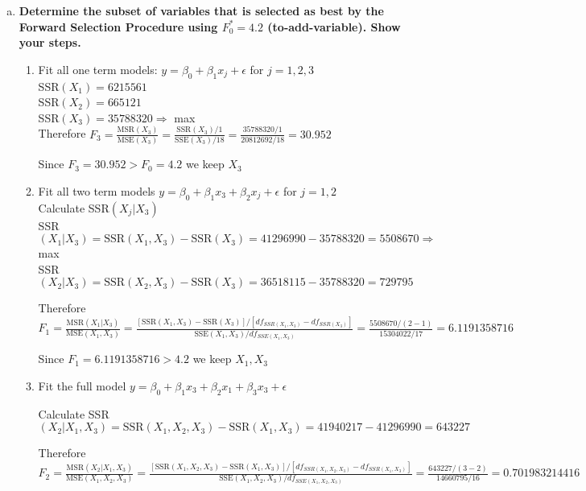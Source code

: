 \documentclass{article}
\begin{document}
\begin{enumerate}[(a)]
\item \textbf{Determine the subset of variables that is selected as best by the Forward Selection Procedure using $F_0^* = 4.2$ (to-add-variable). Show your steps. }

\begin{enumerate}[(1)]
\item Fit all one term models: $y = \beta_0 + \beta_1x_j + \epsilon$ for $j = 1,2,3$ \\
SSR$(X_1) = 6 215 561$ \\
SSR$(X_2) = 665 121$ \\
SSR$(X_3) = 35 788 320 \Rightarrow $ max \\

Therefore $F_3 = \frac{\text{MSR}(X_3)}{\text{MSE}(X_3)} = \frac{\text{SSR}(X_3)/1}{\text{SSE}(X_3)/18} = \frac{35 788 320/1}{20 812 692/18} = 30.952$

Since $F_3 = 30.952 > F_0 = 4.2$ we keep $X_3$

\item Fit all two term models $y = \beta_0 + \beta_1x_3 + \beta_2x_j + \epsilon$ for $j = 1,2$ \\

Calculate SSR$(X_j | X_3)$ \\

SSR$(X_1 | X_3) = \text{SSR}(X_1, X_3) - \text{SSR}(X_3) = 41 296 990 - 35 788 320 = 5 508 670 \Rightarrow$ max\\ 
SSR$(X_2 | X_3) = \text{SSR}(X_2, X_3) - \text{SSR}(X_3) = 36 518 115 - 35 788 320 = 729 795$

Therefore $F_1 = \frac{  \text{MSR}(X_1 | X_3) }{  \text{MSE}(X_1, X_3) } = 
\frac{ [ \text{SSR}(X_1, X_3) - \text{SSR}(X_3) ] / [ df_{SSR(X_1, X_3)} - df_{SSR(X_3)} ]
}{
\text{SSE}(X_1, X_3) / df_{SSE(X_1, X_3)}
}
=  \frac{
 5 508 670 / (2- 1)
}{
15 304 022 / 17
} = 6.1191358716$

Since $F_1 = 6.1191358716 > 4.2$ we keep $X_1, X_3$

\item Fit the full model $y = \beta_0 + \beta_1x_3 + \beta_2x_1 + \beta_3x_3 + \epsilon$

Calculate SSR$(X_2 | X_1, X_3) = \text{SSR}(X_1, X_2, X_3) - \text{SSR}(X_1, X_3) = 41 940 217  - 41 296 990 = 643227$

Therefore $F_2 = \frac{  \text{MSR}(X_2 | X_1, X_3) }{  \text{MSE}(X_1, X_2, X_3) } = 
\frac{ [ \text{SSR}(X_1,X_2, X_3) - \text{SSR}(X_1, X_3) ] / [ df_{SSR(X_1,X_2, X_3)} - df_{SSR(X_1, X_3)} ]
}{
\text{SSE}(X_1,X_2, X_3) / df_{SSE(X_1, X_2, X_3)}
}
=  \frac{
643 227 / (3 - 2)
}{
14 660 795 / 16
} = 0.701983214416$


\end{enumerate}
\end{enumerate}
\end{document}
